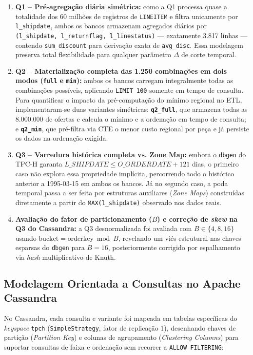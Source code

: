 \documentclass[12pt,a4paper]{article}
\begin{document}
\begin{enumerate}
    \item \textbf{Q1 -- Pré-agregação diária simétrica:} como a Q1 processa quase a totalidade dos 60 milhões de registros de \texttt{LINEITEM} e filtra unicamente por \texttt{l\_shipdate}, ambos os bancos armazenam agregados diários por \texttt{(l\_shipdate, l\_returnflag, l\_linestatus)} --- exatamente 3.817 linhas --- contendo \texttt{sum\_discount} para derivação exata de \texttt{avg\_disc}. Essa modelagem preserva total flexibilidade para qualquer parâmetro $\Delta$ de corte temporal.
    \item \textbf{Q2 -- Materialização completa das 1.250 combinações em dois modos (\texttt{full} e \texttt{min}):} ambos os bancos carregam integralmente todas as combinações possíveis, aplicando \texttt{LIMIT 100} somente em tempo de consulta. Para quantificar o impacto da pré-computação do mínimo regional no ETL, implementaram-se duas variantes simétricas: \textbf{\texttt{q2\_full}}, que armazena todas as 8.000.000 de ofertas e calcula o mínimo e a ordenação em tempo de consulta; e \textbf{\texttt{q2\_min}}, que pré-filtra via CTE o menor custo regional por peça e já persiste os dados na ordenação exigida.
    \item \textbf{Q3 -- Varredura histórica completa vs. Zone Map:} embora o \texttt{dbgen} do TPC-H garanta $L\_SHIPDATE \le O\_ORDERDATE + 121$ dias, o primeiro caso não explora essa propriedade implícita, percorrendo todo o histórico anterior a 1995-03-15 em ambos os bancos. Já no segundo caso, a poda temporal passa a ser feita por estruturas auxiliares (\textit{Zone Maps}) construídas diretamente a partir do \texttt{MAX(l\_shipdate)} observado nos dados reais.
    \item \textbf{Avaliação do fator de particionamento ($B$) e correção de \textit{skew} na Q3 do Cassandra:} a Q3 desnormalizada foi avaliada com $B \in \{4, 8, 16\}$ usando $\text{bucket} = \text{orderkey} \bmod B$, revelando um viés estrutural nas chaves esparsas do \texttt{dbgen} para $B=16$, posteriormente corrigido por espalhamento via \textit{hash} multiplicativo de Knuth.
\end{enumerate}

\subsection{Modelagem Orientada a Consultas no Apache Cassandra}
No Cassandra, cada consulta e variante foi mapeada em tabelas específicas do \textit{keyspace} \texttt{tpch} (\texttt{SimpleStrategy}, fator de replicação 1), desenhando chaves de partição (\textit{Partition Key}) e colunas de agrupamento (\textit{Clustering Columns}) para suportar consultas de faixa e ordenação sem recorrer a \texttt{ALLOW FILTERING}:
\end{document}
